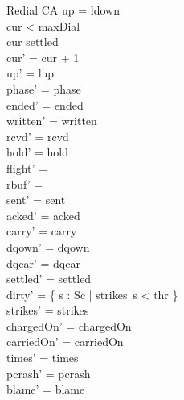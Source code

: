 \documentclass[a4paper,10pt,fleqn]{article}
\begin{document}
\begin{schema}{Redial}
  \Delta CA
\where
  up = ldown \\
  cur < maxDial \\
  cur \in settled \\
  cur' = cur + 1 \\
  up' = lup \\
  phase' = phase \\
  ended' = ended \\
  written' = written \\
  rcvd' = rcvd \\
  hold' = hold \\
  flight' = \emptyset \\
  rbuf' = \emptyset \\
  sent' = sent \\
  acked' = acked \\
  carry' = carry \\
  dqown' = dqown \\
  dqcar' = dqcar \\
  settled' = settled \\
  dirty' = \{ s : Sc | strikes~s < thr \} \\
  strikes' = strikes \\
  chargedOn' = chargedOn \\
  carriedOn' = carriedOn \\
  times' = times \\
  pcrash' = pcrash \\
  blame' = blame
\end{schema}
\end{document}
